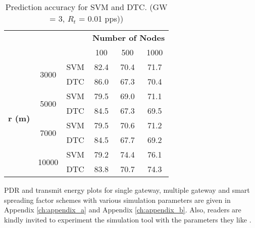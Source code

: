 \begin{table}[h]
\centering
\caption{Prediction accuracy for SVM and DTC. (GW = 3, ${R_{t}}$ = 0.01 pps))}
\label{table:prediction_accuracy}
\begin{tabular}{|c|c|c|c|c|c|}
\hline
\multicolumn{3}{|c|}{\multirow{2}{*}{}}                        & \multicolumn{3}{c|}{\textbf{Number of Nodes}} \\ \cline{4-6}
\multicolumn{3}{|c|}{}                                         & 100           & 500           & 1000          \\ \hline
\multirow{8}{*}{\textbf{r (m)}} & \multirow{2}{*}{3000}  & SVM & 82.4          & 70.4          & 71.7          \\ \cline{3-6}
                                &                        & DTC & 86.0          & 67.3          & 70.4          \\ \cline{2-6}

                                & \multirow{2}{*}{5000}  & SVM & 79.5          & 69.0          & 71.1          \\ \cline{3-6}
                                &                        & DTC & 84.5          & 67.3          & 69.5          \\ \cline{2-6}

                                & \multirow{2}{*}{7000}  & SVM & 79.5          & 70.6          & 71.2          \\ \cline{3-6}
                                &                        & DTC & 84.5          & 67.7          & 69.2          \\ \cline{2-6}

                                & \multirow{2}{*}{10000} & SVM & 79.2          & 74.4          & 76.1          \\ \cline{3-6}
                                &                        & DTC & 83.8          & 70.7          & 74.3          \\ \hline
\end{tabular}
\end{table}

PDR and transmit energy plots for single gateway, multiple gateway and smart spreading factor schemes with various simulation parameters are given in Appendix \ref{ch:appendix_a} and Appendix \ref{ch:appendix_b}. Also, readers are kindly invited to experiment the simulation tool with the parameters they like \cite{tugrul_yatagan_simlorasf}.
